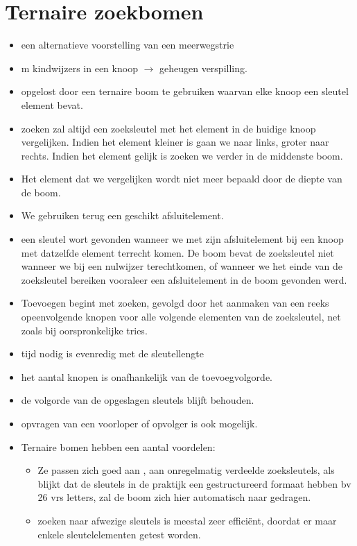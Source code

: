 \section{Ternaire zoekbomen}
\begin{itemize}
\item een alternatieve voorstelling van een meerwegstrie
\item m kindwijzers in een knoop $\rightarrow$ geheugen verspilling.
\item opgelost door een ternaire boom te gebruiken waarvan elke knoop een sleutel element bevat.
\item zoeken zal altijd een zoeksleutel met het element in de huidige knoop vergelijken. Indien het element kleiner is gaan we naar links, groter naar rechts. Indien het element gelijk is zoeken we verder in de middenste boom.
\item Het element dat we vergelijken wordt niet meer bepaald door de diepte van de boom. 
\item We gebruiken terug een geschikt afsluitelement.
\item een sleutel wort gevonden wanneer we met zijn afsluitelement bij een knoop met datzelfde element terrecht komen. De boom bevat de zoeksleutel niet wanneer we bij een nulwijzer terechtkomen, of wanneer we het einde van de zoeksleutel bereiken vooraleer een afsluitelement in de boom gevonden werd.
\item Toevoegen begint met zoeken, gevolgd door het aanmaken van een reeks opeenvolgende knopen voor alle volgende elementen van de zoeksleutel, net zoals bij oorspronkelijke tries.
\item tijd nodig is evenredig met de sleutellengte
\item het aantal knopen is onafhankelijk van de toevoegvolgorde.
\item de volgorde van de opgeslagen sleutels blijft behouden.
\item opvragen van een voorloper of opvolger is ook mogelijk.
\item Ternaire bomen hebben een aantal voordelen:
\begin{itemize}
\item Ze passen zich goed aan , aan onregelmatig verdeelde zoeksleutels, als blijkt dat de sleutels in de praktijk een gestructureerd formaat hebben bv 26 vrs letters, zal de boom zich hier automatisch naar gedragen.
\item zoeken naar afwezige sleutels is meestal zeer effici\"ent, doordat er maar enkele sleutelelementen getest worden.

\end{itemize}
\end{itemize}
